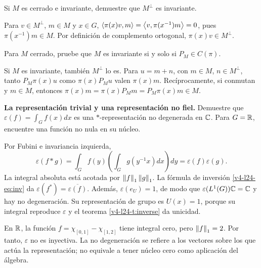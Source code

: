 \begin{ejercicio}\label{ej:v4-l23-3}
Si $M$ es cerrado e invariante, demuestre que $M^\perp$ es invariante.
\end{ejercicio}
\begin{solucion}
Para $v\in M^\perp$, $m\in M$ y $x\in G$, $\left\langle\pi(x)v,m\right\rangle=\left\langle v,\pi(x^{-1})m\right\rangle=0$, pues $\pi(x^{-1})m\in M$. Por definición de complemento ortogonal, $\pi(x)v\in M^\perp$.
\end{solucion}

\begin{ejercicio}\label{ej:v4-l23-4}
Para $M$ cerrado, pruebe que $M$ es invariante si y solo si $P_M\in C(\pi)$.
\end{ejercicio}
\begin{solucion}
Si $M$ es invariante, también $M^\perp$ lo es. Para $u=m+n$, con $m\in M$, $n\in M^\perp$, tanto $P_M\pi(x)u$ como $\pi(x)P_Mu$ valen $\pi(x)m$. Recíprocamente, si conmutan y $m\in M$, entonces $\pi(x)m=\pi(x)P_Mm=P_M\pi(x)m\in M$.
\end{solucion}

\begin{ejercicio}\label{ej:v4-l24-1}
\textbf{La representación trivial y una representación no fiel.}
Demuestre que $\varepsilon(f)=\int_G f(x)dx$ es una $*$-representación no degenerada en $\mathbb C$. Para $G=\mathbb R$, encuentre una función no nula en su núcleo.

\end{ejercicio}
\begin{solucion} Por Fubini e invariancia izquierda,
\[
\varepsilon(f*g)=\int_G f(y)\left(\int_Gg(y^{-1}x)dx\right)dy
=\varepsilon(f)\varepsilon(g).
\]
La integral absoluta está acotada por $\left\lVert f\right\rVert_1\left\lVert g\right\rVert_1$. La fórmula de inversión \eqref{v4-l24-eq:inv} da $\varepsilon(f^*)=\overline{\varepsilon(f)}$. Además, $\varepsilon(e_U)=1$, de modo que $\varepsilon(L^1(G))\mathbb C=\mathbb C$ y hay no degeneración. Su representación de grupo es $U(x)=1$, porque su integral reproduce $\varepsilon$ y el teorema \ref{v4-l24-t:inverse} da unicidad.

En $\mathbb R$, la función $f=\chi_{[0,1]}-\chi_{[1,2]}$ tiene integral cero, pero $\left\lVert f\right\rVert_1=2$. Por tanto, $\varepsilon$ no es inyectiva. La no degeneración se refiere a los vectores sobre los que actúa la representación; no equivale a tener núcleo cero como aplicación del álgebra.\end{solucion}

